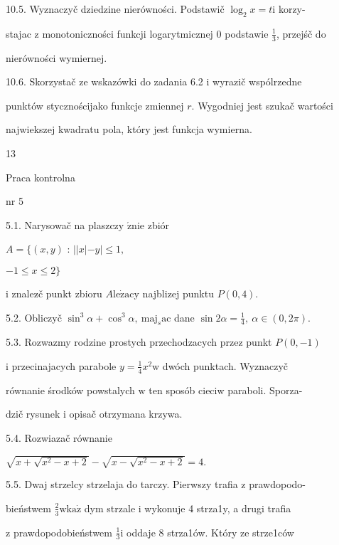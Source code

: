 \documentclass[a4paper,12pt]{article}
\begin{document}
10.5. Wyznaczyč dziedzine nierówności. Podstawič $\log_{2}x=t \mathrm{i}$ korzy-

stajac $\mathrm{z}$ monotoniczności funkcji logarytmicznej $0$ podstawie $\displaystyle \frac{1}{3}$, przejśč do

nierówności wymiernej.

10.6. Skorzystač ze wskazówki do zadania 6.2 $\mathrm{i}$ wyrazič wspólrzedne

punktów stycznościjako funkcje zmiennej $r$. Wygodniej jest szukač wartości

najwiekszej kwadratu pola, który jest funkcja wymierna.





13

Praca kontrolna

nr 5

5.1. Narysowač na plaszczy $\acute{\mathrm{z}}\mathrm{n}\mathrm{i}\mathrm{e}$ zbiór

$A=\{(x,y)$ : $||x|-y|\leq 1,$

$-1\leq x\leq 2\}$

$\mathrm{i}$ znalez$\acute{}$č punkt zbioru $A\mathrm{l}\mathrm{e}\dot{\mathrm{z}}\mathrm{a}\mathrm{c}\mathrm{y}$ najblizej punktu $P(0,4).$

5.2. Obliczyč $\sin^{3}\alpha+\cos^{3}\alpha,\ \mathrm{m}\mathrm{a}\mathrm{j}_{s}\mathrm{a}\mathrm{c}$ dane $\displaystyle \sin 2\alpha=\frac{1}{4},\ \alpha\in(0,2\pi)$.

5.3. Rozwazmy rodzine prostych przechodzacych przez punkt $P(0,-1)$

$\mathrm{i}$ przecinajacych parabole $y = \displaystyle \frac{1}{4}x^{2} \mathrm{w}$ dwóch punktach. Wyznaczyč

równanie środków powstalych $\mathrm{w}$ ten sposób cieciw paraboli. Sporza-

dzič rysunek $\mathrm{i}$ opisač otrzymana krzywa.

5.4. Rozwiazač równanie

$\sqrt{x+\sqrt{x^{2}-x+2}}-\sqrt{x-\sqrt{x^{2}-x+2}}=4.$

5.5. Dwaj strzelcy strzelaja do tarczy. Pierwszy trafia $\mathrm{z}$ prawdopodo-

bieństwem $\displaystyle \frac{2}{3} \mathrm{w} \mathrm{k}\mathrm{a}\dot{\mathrm{z}}$ dym strzale $\mathrm{i}$ wykonuje 4 strza1y, a drugi trafia

$\mathrm{z}$ prawdopodobieństwem $\displaystyle \frac{1}{3} \mathrm{i}$ oddaje 8 strza1ów. Który ze strze1ców
\end{document}
